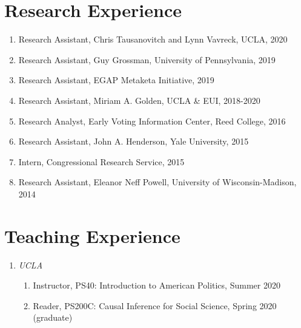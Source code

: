 \documentclass[12pt]{article}
\begin{document}
\section*{Research Experience}
 
\begin{enumerate}[topsep = 0pt, itemsep = 1ex, partopsep  = 1ex, parsep = 1ex]

	\item[] Research Assistant, Chris Tausanovitch and Lynn Vavreck, UCLA, 2020

	\item[] Research Assistant, Guy Grossman, University of Pennsylvania, 2019
	
	\item[] Research Assistant, EGAP Metaketa Initiative, 2019
	
	\item[] Research Assistant, Miriam A. Golden, UCLA \& EUI, 2018-2020
	
	\item[] Research Analyst, Early Voting Information Center, Reed College, 2016
	
	\item[] Research Assistant, John A. Henderson, Yale University, 2015
	
	\item[] Intern, Congressional Research Service, 2015
	
	\item[] Research Assistant, Eleanor Neff Powell, University of Wisconsin-Madison, 2014
	
\end{enumerate}

\section*{Teaching Experience}

\begin{enumerate}[topsep = 0pt, itemsep = -1ex, partopsep  = 1ex, parsep = 1ex]
	
	\item[] \textit{UCLA}
	
	\begin{enumerate}[topsep = 0pt, itemsep = -1ex, partopsep = -1ex, parsep = 1ex]
		
		\item[] Instructor, PS40: Introduction to American Politics, Summer 2020 
		\item[] Reader, PS200C: Causal Inference for Social Science, Spring 2020 (graduate)
		
	\end{enumerate}

\end{enumerate}
\end{document}
